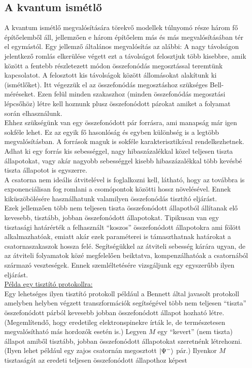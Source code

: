 \subsection{A kvantum ismétlő}
A kvantum ismétlő megvalósítására törekvő modellek túlnyomó része három fő építőelemből áll, jellemzően e három építőelem más és más megvalósításában tér el egymástól. Egy jellemző általános megvalósítás az alábbi:
A nagy távolságon jelentkező romlás elkerülése végett ezt a távolságot felosztjuk több kisebbre, amik között a fentebb részletezett módon összefonódás megosztással teremtünk kapcsolatot. A felosztott kis távolságok között állomásokat alakítunk ki (ismétlőket). Itt végezzük el az összefonódás megosztáshoz szükséges Bell-méréseket. Ezen felül minden szakaszhoz (minden összefonódás megosztási lépcsőhöz) létre kell hoznunk plusz összefonódott párokat amiket a folyamat során elhasználunk.\\
 Ehhez szükségünk van egy összefonódott pár forrásra, ami manapság már igen sokféle lehet. %
Ez az egyik fő hasonlóság és egyben különbség is a legtöbb megvalósításban. A források maguk is sokféle karakterisztikával rendelkezhetnek. Adhat ki egy forrás kis sebességgel, nagy hibaszázalékkal közel teljesen tiszta állapotokat, vagy akár nagyobb sebességgel kisebb hibaszázalékkal több kevésbé tiszta állapotot is egyszerre.\\
 A csatorna nem ideális átvitelével is foglalkozni kell, látható, hogy az továbbra is exponenciálisan fog romlani a csomópontok közötti hossz növelésével. Ennek kiküszöbölésére használhatunk valamilyen összefonódás tisztító eljárást.\\
 Ezek jellemzően több nem teljesen tiszta összefonódott állapotból állítanak elő kevesebb, tisztább, jobban összefonódott állapotokat. Tipikusan van egy tisztasági határérték a felhasznált “koszos” összefonódott állapotokra ami fölött alkalmazhatóak, emiatt akár ezek paraméterei is támaszthatnak határokat a csatornaszakaszok hossza felé. Segítségükkel az átviteli sebesség kárára ugyan, de az átviteli folyamatok közé megfelelően beiktatva, kompenzálhatóak a csatornából származó veszteségek. Ennek szemléltetésére vizsgáljunk egy egyszerűbb ilyen eljárást.\\
\underline{Példa egy tisztító protokollra:}\\
Egy lehetséges ilyen tisztító protokoll például a Bennett által javasolt protokoll\cite{bennett1996purification} amelyben helyben végzett transzformációk segítségével több nem teljesen “tiszta” összefonódott párból kevesebb jobban összefonódott állapot hozható létre. (Megemlítendő, hogy eredetileg elektronspinekre írták le, de természetesen megvalósítható más hordozók esetén is.) Legyen $M$ egy “kevert” (nem tiszta) állapot amiből tisztább, jobban összefonódott állapotokat szeretnénk létrehozni. (Ilyen lehet például egy zajos csatornán megosztott $ \ket{\Psi^-} $  pár.) Ilyenkor $M$ tisztaságát az eredeti teljesen összefonódott állapothoz képest 
